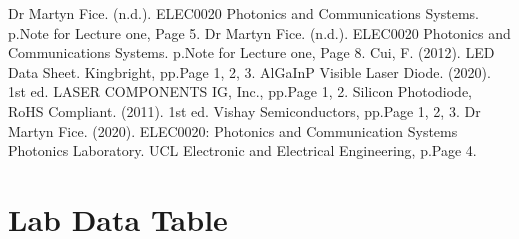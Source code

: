 \documentclass[12pt]{article}
\begin{document}
    \newpage   
    \begin{thebibliography}{}
    Dr Martyn Fice. (n.d.). ELEC0020 Photonics and Communications Systems. p.Note for Lecture one, Page 5.
    Dr Martyn Fice. (n.d.). ELEC0020 Photonics and Communications Systems. p.Note for Lecture one, Page 8.
    Cui, F. (2012). LED Data Sheet. Kingbright, pp.Page 1, 2, 3.
    AlGaInP Visible Laser Diode. (2020). 1st ed. LASER COMPONENTS IG, Inc., pp.Page 1, 2.
    Silicon Photodiode, RoHS Compliant. (2011). 1st ed. Vishay Semiconductors, pp.Page 1, 2, 3.
    Dr Martyn Fice. (2020). ELEC0020: Photonics and Communication Systems Photonics Laboratory. UCL Electronic and Electrical Engineering, p.Page 4.
    \end{thebibliography}
    
    
    
    \newpage
    \appendix
    \section{Lab Data Table}
\end{document}
